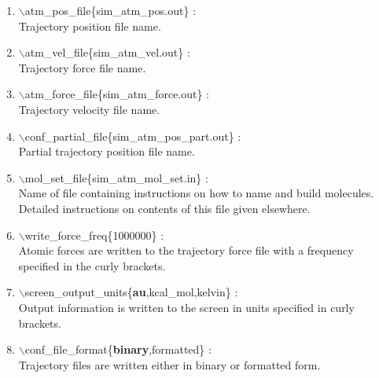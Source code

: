 \begin{itemize}
\begin{enumerate}
 \vspace{0.15in}\Large
 \item   $\backslash$atm\_pos\_file\{sim\_atm\_pos.out\} : \\
   \large
     Trajectory position file name.

 \vspace{0.15in} \Large
 \item   $\backslash$atm\_vel\_file\{sim\_atm\_vel.out\} : \\
  \large Trajectory force file name.  

 \vspace{0.15in} \Large
 \item   $\backslash$atm\_force\_file\{sim\_atm\_force.out\} : \\
   \large
     Trajectory velocity file name.

 \vspace{0.15in}
 \Large
 \item   $\backslash$conf\_partial\_file\{sim\_atm\_pos\_part.out\} : \\
   \large
     Partial trajectory position file name.

 \vspace{0.15in} \Large
 \item   $\backslash$mol\_set\_file\{sim\_atm\_mol\_set.in\} : \\
   \large
    Name of file containing instructions on how to name and build molecules.
    Detailed instructions on contents of this file given elsewhere.

 \vspace{0.15in} \Large
 \item   $\backslash$write\_force\_freq\{1000000\} : \\
   \large
   Atomic forces are written to the trajectory force file with a
   frequency specified in the curly brackets.

 \vspace{0.15in} \Large
 \item   $\backslash$screen\_output\_units\{{\bf au},kcal\_mol,kelvin\} : \\
   \large
   Output information is written to the screen in units specified 
   in curly brackets.

 \vspace{0.15in} \Large
 \item   $\backslash$conf\_file\_format\{{\bf binary},formatted\} : \\
   \large
   Trajectory files are written either in binary or formatted form.


\end{enumerate}
\end{itemize}
